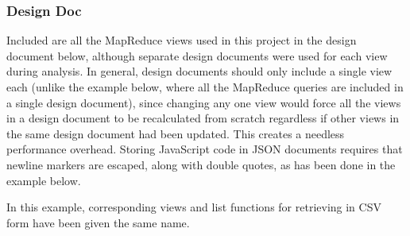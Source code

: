 \subsubsection{Design Doc}
\label{msc-design-doc}
Included are all the MapReduce views used in this project in the design document below, although separate design documents were used for each view during analysis. In general, design documents should only include a single view each (unlike the example below, where all the MapReduce queries are included in a single design document), since changing any one view would force all the views in a design document to be recalculated from scratch regardless if other views in the same design document had been updated. This creates a needless performance overhead. Storing JavaScript code in JSON documents requires that newline markers are escaped, along with double quotes, as has been done in the example below.

In this example, corresponding views and list functions for retrieving in CSV form have been given the same name.

\begin{verbatim}

\end{verbatim}